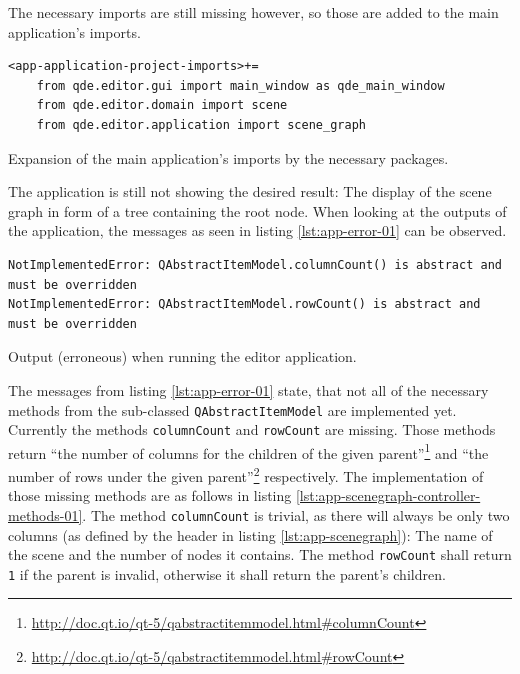 \documentclass[10pt, openright, notitlepage]{scrreprt}
\begin{document}
The necessary imports are still missing however, so those are added to the main
application's imports.

\begin{listing}[H]
\begin{verbatim}
<app-application-project-imports>+=
    from qde.editor.gui import main_window as qde_main_window
    from qde.editor.domain import scene
    from qde.editor.application import scene_graph
\end{verbatim}
\caption{Expansion of the main application's imports by the necessary packages.}
\end{listing}

The application is still not showing the desired result: The display of the
scene graph in form of a tree containing the root node. When looking at the
outputs of the application, the messages as seen in listing \ref{lst:app-error-01} can
be observed.

\begin{listing}[H]
\begin{verbatim}
NotImplementedError: QAbstractItemModel.columnCount() is abstract and must be overridden
NotImplementedError: QAbstractItemModel.rowCount() is abstract and must be overridden
\end{verbatim}
\caption{\label{lst:app-error-01}
Output (erroneous) when running the editor application.}
\end{listing}

The messages from listing \ref{lst:app-error-01} state, that not all of the necessary
methods from the sub-classed \texttt{QAbstractItemModel} are implemented yet.
Currently the methods \texttt{columnCount} and \texttt{rowCount} are
missing. Those methods return ``the number of columns for the children of the
given
parent''\footnote{\url{http://doc.qt.io/qt-5/qabstractitemmodel.html\#columnCount}}
and ``the number of rows under the given
parent''\footnote{\url{http://doc.qt.io/qt-5/qabstractitemmodel.html\#rowCount}}
respectively. The implementation of those missing methods are as follows in
listing \ref{lst:app-scenegraph-controller-methods-01}. The method
\texttt{columnCount} is trivial, as there will always be only two columns (as
defined by the header in listing \ref{lst:app-scenegraph}): The name of the scene and
the number of nodes it contains. The method \texttt{rowCount} shall return
\texttt{1} if the parent is invalid, otherwise it shall return the parent's children.
\end{document}

